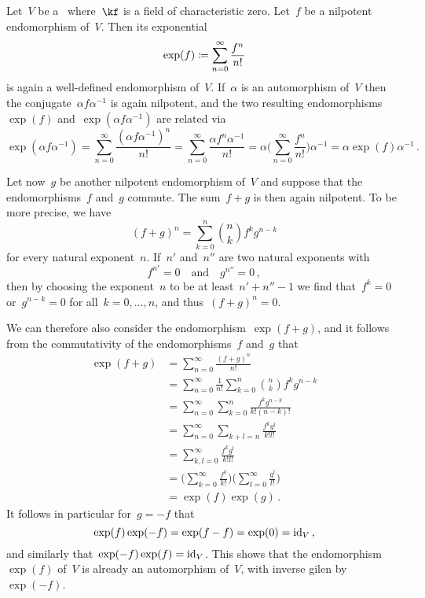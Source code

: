\begin{recall}
	Let~$V$ be a~\vectorspace{$\kf$} where~$\kf$ is a field of characteristic zero.
	Let~$f$ be a nilpotent endomorphism of~$V$.
	Then its exponential
	\[
		\exp(f)
		\coloneqq
		\sum_{n=0}^\infty
		\frac{f^n}{n!}
		\label{exponential}
	\]
	is again a well-defined endomorphism of~$V$.
	If~$\alpha$ is an automorphism of~$V$ then the conjugate~$\alpha f \alpha^{-1}$ is again nilpotent, and the two resulting endomorphisms~$\exp(f)$ and~$\exp(\alpha f \alpha^{-1})$ are related via
	\[
		\exp( \alpha f \alpha^{-1} )
		=
		\sum_{n=0}^\infty
		\frac{ (\alpha f \alpha^{-1})^n }{n!}
		=
		\sum_{n=0}^\infty
		\frac{ \alpha f^n \alpha^{-1} }{n!}
		=
		\alpha
		\Biggl(
			\sum_{n=0}^\infty
			\frac{f^n}{n!}
		\Biggr)
		\alpha^{-1}
		=
		\alpha \exp(f) \alpha^{-1} \,.
	\]

	Let now~$g$ be another nilpotent endomorphism of~$V$ and suppose that the endomorphisms~$f$ and~$g$ commute.
	The sum~$f + g$ is then again nilpotent.
	To be more precise, we have
	\[
		(f + g)^n
		=
		\sum_{k=0}^n
		\binom{n}{k}
		f^k g^{n-k}
	\]
	for every natural exponent~$n$.
	If~$n'$ and~$n''$ are two natural exponents with
	\[
		f^{n'} = 0
		\quad\text{and}\quad
		g^{n''} = 0 \,,
	\]
	then by choosing the exponent~$n$ to be at least~$n' + n'' - 1$ we find that~$f^k = 0$ or~$g^{n-k} = 0$ for all~$k = 0, \dotsc, n$, and thus~$(f + g)^n = 0$.

	We can therefore also consider the endomorphism~$\exp(f + g)$, and it follows from the commutativity of the endomorphisms~$f$ and~$g$ that
	\begingroup
	\allowdisplaybreaks
	\begin{align*}
		\exp(f + g)
		&=
		\sum_{n=0}^\infty
		\frac{(f + g)^n}{n!}
		\\
		&=
		\sum_{n=0}^\infty
		\frac{1}{n!}
		\sum_{k=0}^n
		\binom{n}{k}
		f^k g^{n-k}
		\\
		&=
		\sum_{n=0}^\infty
		\sum_{k=0}^n
		\frac{f^k g^{n-k}}{k!(n-k)!}
		\\
		&=
		\sum_{n=0}^\infty
		\sum_{k + l = n}
		\frac{f^k g^l}{k! l!}
		\\
		&=
		\sum_{k, l = 0}^\infty
		\frac{f^k g^l}{k! l!}
		\\
		&=
		\Biggl(
			\sum_{k=0}^\infty
			\frac{f^k}{k!}
		\Biggr)
		\Biggl(
			\sum_{l=0}^\infty
			\frac{g^l}{l!}
		\Biggr)
		\\
		&=
		\exp(f) \exp(g) \,.
	\end{align*}
	\endgroup
	It follows in particular for~$g = -f$ that
	\[
		\exp(f) \exp(-f) = \exp(f - f) = \exp(0) = \mathrm{id}_V \,,
	\]
	and similarly that~$\exp(-f) \exp(f) = \mathrm{id}_V$.
	This shows that the endomorphism~$\exp(f)$ of~$V$ is already an automorphism of~$V$, with inverse gilen by~$\exp(-f)$.
\end{recall}


